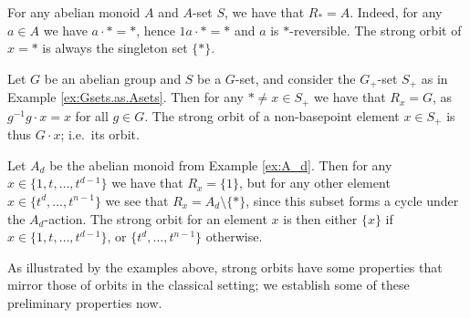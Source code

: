 \documentclass[11pt]{amsart}
\begin{document}
\begin{example}
    For any abelian monoid $A$ and $A$-set $S$, we have that $R_*=A$. Indeed, for any $a\in A$ we have $a\cdot *=*$, hence $1a\cdot *=*$ and $a$ is $*$-reversible. The strong orbit of $x=*$ is always the singleton set $\{*\}$. 
\end{example}

\begin{example}
    Let $G$ be an abelian group and $S$ be a $G$-set, and consider the $G_+$-set $S_+$ as in Example \ref{ex:Gsets.as.Asets}. Then for any $*\neq x\in S_+$ we have that $R_x=G$, as $g^{-1}g\cdot x=x$ for all $g\in G$. The strong orbit of a non-basepoint element $x\in S_+$ is thus $G\cdot x$; i.e.\  its orbit. 
\end{example}

\begin{example}\label{ex:A_d.ambits}
Let $A_d$ be the abelian monoid from Example \ref{ex:A_d}. Then for any $x\in\{1,t,\dots, t^{d-1}\}$ we have that $R_x=\{1\}$, but for any other  element $x\in\{t^d,\dots,t^{n-1}\}$ we see that $R_x=A_d\setminus \{*\}$, since this subset forms a cycle under the $A_d$-action. The strong orbit for an element $x$ is then either $\{x\}$ if $x\in\{1,t,\dots, t^{d-1}\}$, or $\{t^d,\dots,t^{n-1}\}$  otherwise. 
\end{example}

As illustrated by the examples above, strong orbits have some properties that mirror those of orbits in the classical setting; we establish some of these preliminary properties now.
\end{document}
